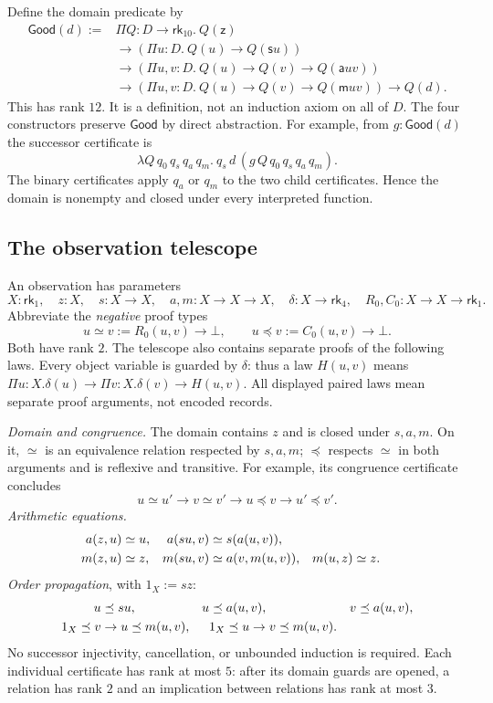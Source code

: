 \documentclass[11pt,a4paper]{article}
\newcommand{\rk}[1]{\mathsf{rk}_{#1}}
\newcommand{\Good}{\mathsf{Good}}
\newcommand{\zz}{\mathsf z}
\newcommand{\ssu}{\mathsf s}
\newcommand{\addD}{\mathsf a}
\newcommand{\mm}{\mathsf m}
\theoremstyle{remark}\newtheorem*{remark}{Remark}
\begin{document}
Define the domain predicate by
\begin{align*}
 \Good(d):={}&\Pi Q:D\to\rk{10}.\ Q(\zz)\\[-2pt]
 &\to(\Pi u:D.\ Q(u)\to Q(\ssu u))\\[-2pt]
 &\to(\Pi u,v:D.\ Q(u)\to Q(v)\to Q(\addD u v))\\[-2pt]
 &\to(\Pi u,v:D.\ Q(u)\to Q(v)\to Q(\mm u v))\to Q(d).
\end{align*}
This has rank $12$. It is a definition, not an induction axiom on all of $D$.
The four constructors preserve $\Good$ by direct abstraction. For example,
from $g:\Good(d)$ the successor certificate is
\[
 \lambda Q\,q_0\,q_s\,q_a\,q_m.\
 q_s\,d\,(g\,Q\,q_0\,q_s\,q_a\,q_m).
\]
The binary certificates apply $q_a$ or $q_m$ to the two child certificates.
Hence the domain is nonempty and closed under every interpreted function.

\subsection*{The observation telescope}
An observation has parameters
\[
 X:\rk1,\quad z:X,\quad s:X\to X,\quad a,m:X\to X\to X,
 \quad\delta:X\to\rk4,\quad R_0,C_0:X\to X\to\rk1.
\]
Abbreviate the \emph{negative} proof types
\[
 u\simeq v:=R_0(u,v)\to\bot,\qquad
 u\preceq v:=C_0(u,v)\to\bot.
\]
Both have rank $2$. The telescope also contains separate proofs of the
following laws. Every object variable is guarded by $\delta$: thus a law
$H(u,v)$ means $\Pi u:X.\delta(u)\to\Pi v:X.\delta(v)\to H(u,v)$.
All displayed paired laws mean separate proof arguments, not encoded records.

\emph{Domain and congruence.} The domain contains $z$ and is closed under
$s,a,m$. On it, $\simeq$ is an equivalence relation respected by $s,a,m$;
$\preceq$ respects $\simeq$ in both arguments and is reflexive and transitive.
For example, its congruence certificate concludes
\[
 u\simeq u'\to v\simeq v'\to u\preceq v\to u'\preceq v'.
\]
\emph{Arithmetic equations.}
\begin{align}
 a(z,u)&\simeq u,&a(su,v)&\simeq s(a(u,v)),\notag\\
 m(z,u)&\simeq z,&m(su,v)&\simeq a(v,m(u,v)),&m(u,z)&\simeq z.
 \label{eq:alg-equations}
\end{align}
\emph{Order propagation}, with $1_X:=sz$:
\begin{align}
 u&\preceq su,&u&\preceq a(u,v),&v&\preceq a(u,v),\notag\\
 1_X\preceq v&\to u\preceq m(u,v),&&
 1_X\preceq u\to v\preceq m(u,v).
 \label{eq:alg-order}
\end{align}
No successor injectivity, cancellation, or unbounded induction is required.
Each individual certificate has rank at most $5$: after its domain guards
are opened, a relation has rank $2$ and an implication between relations
has rank at most $3$.
\end{document}
